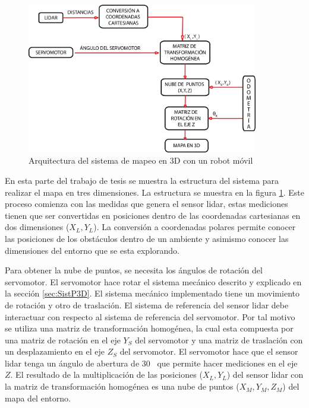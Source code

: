 \begin{figure}%
	\centering \footnotesize
	\includegraphics[width=0.9\textwidth]{images/estructura_3d.png}
	\captionsetup{font=footnotesize}
	\caption{Arquitectura del sistema de mapeo en 3D con un robot móvil}
	\label{fig:Sist3D}
\end{figure}

En esta parte del trabajo de tesis se muestra la estructura del sistema para realizar el
mapa en tres dimensiones. La estructura se muestra en la figura \ref{fig:Sist3D}. Este 
proceso comienza con las medidas que genera el sensor lidar, estas mediciones tienen
que ser convertidas en posiciones dentro de las coordenadas cartesianas en dos dimensiones
($X_{L}, Y_{L}$). La conversión a coordenadas polares permite conocer las posiciones de los 
obstáculos dentro de un ambiente y asimismo conocer las dimensiones del entorno que se esta 
explorando.

Para obtener la nube de puntos, se necesita los ángulos de rotación del servomotor. El 
servomotor hace rotar el sistema mecánico descrito y explicado en la sección 
\ref{sec:SistP3D}. El sistema mecánico implementado tiene un movimiento de rotación y otro 
de traslación. El sistema de referencia del sensor lidar debe interactuar con respecto al 
sistema de referencia del servomotor. Por tal motivo se utiliza una matriz de transformación 
homogénea, la cual esta compuesta por una matriz de rotación en el eje $Y_{S}$ del servomotor 
y una matriz de traslación con un desplazamiento en el eje $Z_{S}$ del servomotor. El
servomotor hace que el sensor lidar tenga un ángulo de abertura de 30\grad~ que permite
hacer mediciones en el eje $Z$. El resultado de la multiplicación de las posiciones 
($X_{L}, Y_{L}$) del sensor lidar con la matriz de transformación homogénea es
una nube de puntos ($X_{M}, Y_{M}, Z_{M}$) del mapa del entorno.

